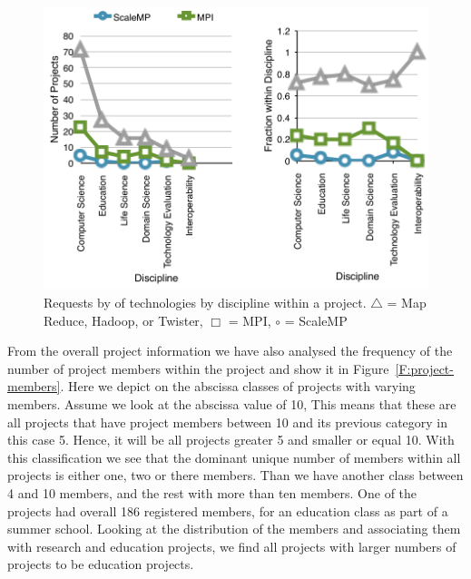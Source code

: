 \documentclass{article}
\begin{document}
\begin{figure}[p]
  \centering
    \includegraphics[width=.75\textwidth]{images/trend-b.pdf}
  \caption{Requests by of technologies by discipline within a
    project. $\bigtriangleup$ = Map Reduce, Hadoop, or Twister,
    $\Box$  = MPI, $\circ$ = ScaleMP}
   \label{F:trend-b}
\end{figure}

From the overall project information we have also analysed the
frequency of the number of project members within the project and show
it in Figure~\ref{F:project-members}. Here we depict on the abscissa
classes of projects with varying members.  Assume we look at the
abscissa value of 10, This means that these are all projects that
have project members between 10 and its previous category in this case
5. Hence, it will be all projects greater  5 and smaller or equal
10. With this classification  we see that the dominant unique number of
members within all projects is either one, two or there members. Than
we have another class between 4 and 10 members, and the rest with more
than ten members. One of the projects had overall 186 registered
members, for an education class as part of a summer school. Looking at
the distribution of the members and associating them with research and
education projects, we find all projects with larger numbers of
projects to be education projects.




\end{document}
